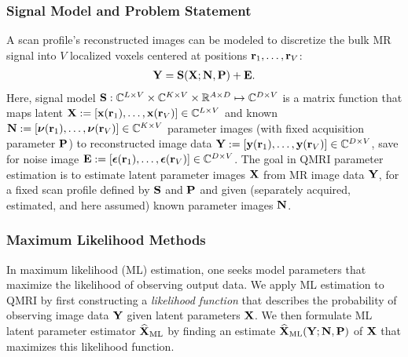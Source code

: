 \subsubsection{Signal Model and Problem Statement}
\label{sss,relax,meth,est,sig}

A scan profile's reconstructed images
can be modeled 
to discretize the bulk MR signal 
into $V$ localized voxels
centered at positions $\mathbf{r}_1,\dots,\mathbf{r}_V$:
\begin{align}
	\bmY = \bmS\paren{\bmX; \bmN, \bmP} + \bmE.
	\label{eq:relax,mod-mtx}
\end{align}
Here, signal model
$\mathbf{S} : \mathbb{C}^{L\times V} \times \mathbb{C}^{K\times V}
\times \mathbb{R}^{A \times D} \mapsto \mathbb{C}^{D \times V}$ 
is a matrix function
that maps latent 
$\bmX := \brac{\bmx\paren{\bmr_1},\dots,\bmx\paren{\bmr_V}} 
\in \complexes{L\times V}$
and known 
$\bmN := \brac{\bmnu\paren{\bmr_1},\dots,\bmnu\paren{\bmr_V}} 
\in \complexes{K\times V}$
parameter images 
(with fixed acquisition parameter $\mathbf{P}$)
to reconstructed image data
$\bmY := \brac{\bmy\paren{\bmr_1},\dots,\bmy\paren{\bmr_V}} 
\in \complexes{D\times V}$,
save for noise image
$\bmE := \brac{\bmeps\paren{\bmr_1},\dots,\bmeps\paren{\bmr_V}} 
\in \complexes{D\times V}$. 
The goal in QMRI parameter estimation
is to estimate latent parameter images $\mathbf{X}$ 
from MR image data $\mathbf{Y}$,
for a fixed scan profile defined by $\mathbf{S}$ and $\mathbf{P}$
and given (separately acquired, estimated, and here assumed)
known parameter images $\mathbf{N}$.

\subsubsection{Maximum Likelihood Methods}
\label{sss,relax,meth,est,ml}

In maximum likelihood (ML) estimation,
one seeks model parameters
that maximize the likelihood
of observing output data.
We apply ML estimation to QMRI
by first constructing 
a \emph{likelihood function}
that describes the probability 
of observing image data $\mathbf{Y}$
given latent parameters $\mathbf{X}$.
We then formulate 
ML latent parameter estimator $\widehat{\mathbf{X}}_\mathrm{ML}$
by finding an estimate $\estaML{\bmX}{\bmY; \bmN, \bmP}$ 
of $\mathbf{X}$
that maximizes this likelihood function. 

